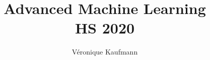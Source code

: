 \documentclass[11pt,a4paper,fleqn,landscape]{scrartcl}
\title{Advanced Machine Learning \\ 
			{HS 2020}
		}
\author{V\'{e}ronique Kaufmann}
\begin{document}
	
\raggedright

\begin{multicols*}{5}
				
	 		
		
				
		 
		
			
		
		
	
	
	
	
\end{multicols*}
\end{document}
